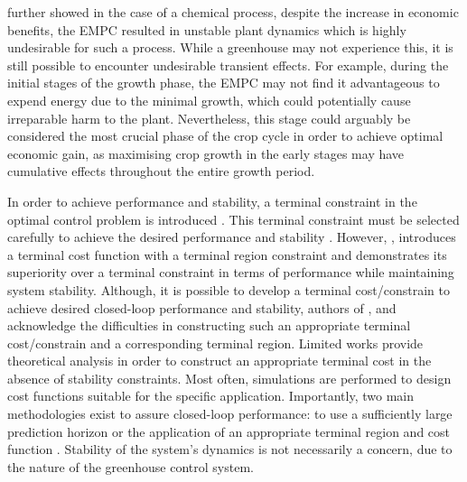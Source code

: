 \cite{rawlingsFundamentalsEconomicModel2012} further showed  in the case of a chemical process, despite the increase in economic benefits, the EMPC  resulted in unstable plant dynamics which is highly undesirable for such a process. While a greenhouse may not experience this, it is still possible to encounter undesirable transient effects. For example, during the initial stages of the growth phase, the EMPC may not find it advantageous to expend energy due to the minimal growth, which could potentially cause irreparable harm to the plant. Nevertheless, this stage could arguably be considered the most crucial phase of the crop cycle in order to achieve optimal economic gain, as maximising crop growth in the early stages may have cumulative effects throughout the entire growth period.

In order to achieve performance and stability, a terminal constraint in the optimal control problem is introduced \cite{amritEconomicOptimizationUsing2011}. This terminal constraint must be selected carefully to achieve the desired performance and stability \cite{rawlingsFundamentalsEconomicModel2012}. However, \cite{amritEconomicOptimizationUsing2011}, introduces a terminal cost function with a terminal region constraint and demonstrates its superiority over a terminal constraint in terms of performance while maintaining system stability. Although, it is possible to develop a terminal cost/constrain to achieve desired closed-loop performance and stability, authors of \cite{rawlingsFundamentalsEconomicModel2012}, \cite{amritEconomicOptimizationUsing2011} and \cite{ellisTutorialReviewEconomic2014} acknowledge the difficulties in constructing such an appropriate terminal cost/constrain and a corresponding terminal region. Limited works provide theoretical analysis in order to construct an appropriate terminal cost in the absence of stability constraints. Most often, simulations are performed to design cost functions suitable for the specific application. Importantly, two main methodologies exist to assure closed-loop performance: to use a sufficiently large prediction horizon or the application of an appropriate terminal region and cost function \cite{ellisTutorialReviewEconomic2014}. Stability of the system's dynamics is not necessarily a concern, due to the nature of the greenhouse control system.


